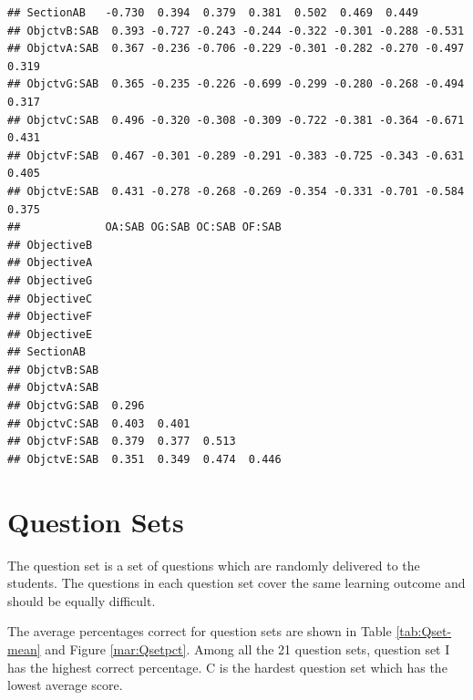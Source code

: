 \documentclass[12pt,nohyper]{tufte-handout}\usepackage[]{graphicx}\usepackage[]{color}
\makeatletter
\newenvironment{kframe}{%
 \def\at@end@of@kframe{}%
 \ifinner\ifhmode%
  \def\at@end@of@kframe{\end{minipage}}%
  \begin{minipage}{\columnwidth}%
 \fi\fi%
 \def\FrameCommand##1{\hskip\@totalleftmargin \hskip-\fboxsep
 \colorbox{shadecolor}{##1}\hskip-\fboxsep
     \hskip-\linewidth \hskip-\@totalleftmargin \hskip\columnwidth}%
 \MakeFramed {\advance\hsize-\width
   \@totalleftmargin\z@ \linewidth\hsize
   \@setminipage}}%
 {\par\unskip\endMakeFramed%
 \at@end@of@kframe}
\newenvironment{knitrout}{}{} %
\makeatother
\begin{document}
\begin{knitrout}
\begin{kframe}
\begin{verbatim}
## SectionAB   -0.730  0.394  0.379  0.381  0.502  0.469  0.449              
## ObjctvB:SAB  0.393 -0.727 -0.243 -0.244 -0.322 -0.301 -0.288 -0.531       
## ObjctvA:SAB  0.367 -0.236 -0.706 -0.229 -0.301 -0.282 -0.270 -0.497  0.319
## ObjctvG:SAB  0.365 -0.235 -0.226 -0.699 -0.299 -0.280 -0.268 -0.494  0.317
## ObjctvC:SAB  0.496 -0.320 -0.308 -0.309 -0.722 -0.381 -0.364 -0.671  0.431
## ObjctvF:SAB  0.467 -0.301 -0.289 -0.291 -0.383 -0.725 -0.343 -0.631  0.405
## ObjctvE:SAB  0.431 -0.278 -0.268 -0.269 -0.354 -0.331 -0.701 -0.584  0.375
##             OA:SAB OG:SAB OC:SAB OF:SAB
## ObjectiveB                             
## ObjectiveA                             
## ObjectiveG                             
## ObjectiveC                             
## ObjectiveF                             
## ObjectiveE                             
## SectionAB                              
## ObjctvB:SAB                            
## ObjctvA:SAB                            
## ObjctvG:SAB  0.296                     
## ObjctvC:SAB  0.403  0.401              
## ObjctvF:SAB  0.379  0.377  0.513       
## ObjctvE:SAB  0.351  0.349  0.474  0.446
\end{verbatim}
\end{kframe}
\end{knitrout}


\clearpage
\newpage{}

\section{Question Sets}
The question set is a set of questions which are randomly delivered to the students. The questions in each question set cover the same learning outcome and should be equally difficult. 

The average percentages correct for question sets are shown in Table \ref{tab:Qset-mean} and Figure \ref{mar:Qsetpct}. Among all the 21 question sets, question set I has the highest correct percentage. C is the hardest question set which has the lowest average score.
\end{document}
